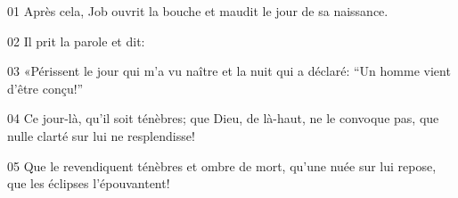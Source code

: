 01 Après cela, Job ouvrit la bouche et maudit le jour de sa naissance.

02 Il prit la parole et dit:

03 «Périssent le jour qui m’a vu naître et la nuit qui a déclaré: “Un homme vient d’être conçu!”

04 Ce jour-là, qu’il soit ténèbres; que Dieu, de là-haut, ne le convoque pas, que nulle clarté sur lui ne resplendisse!

05 Que le revendiquent ténèbres et ombre de mort, qu’une nuée sur lui repose, que les éclipses l’épouvantent!

